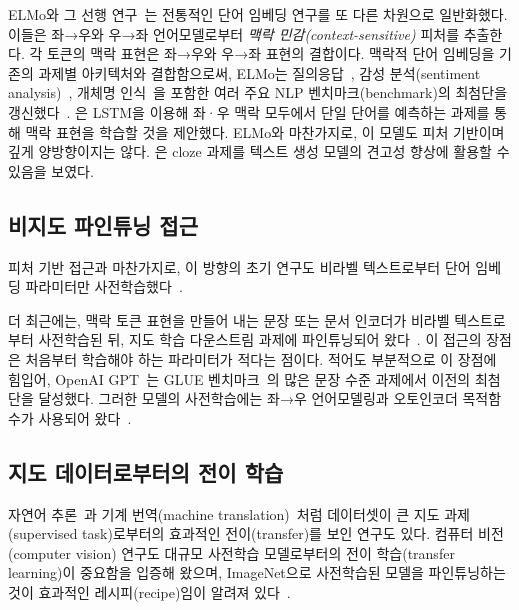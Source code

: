ELMo와 그 선행 연구~\cite{peters-etal:2017:_semi, peters-etal:2018:_deep}는 전통적인 단어 임베딩 연구를 또 다른 차원으로 일반화했다. 이들은 좌→우와 우→좌 언어모델로부터 \emph{맥락 민감(context-sensitive)} 피처를 추출한다. 각 토큰의 맥락 표현은 좌→우와 우→좌 표현의 결합이다. 맥락적 단어 임베딩을 기존의 과제별 아키텍처와 결합함으로써, ELMo는 질의응답~\cite{rajpurkar-etal:2016:_squad}, 감성 분석(sentiment analysis)~\cite{socher-etal:2013:_recur}, 개체명 인식~\cite{tjong-de:2003}을 포함한 여러 주요 NLP 벤치마크(benchmark)의 최첨단을 갱신했다~\cite{peters-etal:2018:_deep}.
\citet{melamud2016context2vec}은 LSTM을 이용해 좌·우 맥락 모두에서 단일 단어를 예측하는 과제를 통해 맥락 표현을 학습할 것을 제안했다. ELMo와 마찬가지로, 이 모델도 피처 기반이며 깊게 양방향이지는 않다.
\citet{fedus2018maskgan}은 cloze 과제를 텍스트 생성 모델의 견고성 향상에 활용할 수 있음을 보였다.




\subsection{비지도 파인튜닝 접근}

피처 기반 접근과 마찬가지로, 이 방향의 초기 연구도 비라벨 텍스트로부터 단어 임베딩 파라미터만 사전학습했다~\cite{collobert-weston:2008}.

더 최근에는, 맥락 토큰 표현을 만들어 내는 문장 또는 문서 인코더가 비라벨 텍스트로부터 사전학습된 뒤, 지도 학습 다운스트림 과제에 파인튜닝되어 왔다~\cite{dai-le:2015:_semi, howard-ruder:2018, radford-etal:2018}. 이 접근의 장점은 처음부터 학습해야 하는 파라미터가 적다는 점이다. 적어도 부분적으로 이 장점에 힘입어, OpenAI GPT~\cite{radford-etal:2018}는 GLUE 벤치마크~\cite{wang-etal:2018:_glue}의 많은 문장 수준 과제에서 이전의 최첨단을 달성했다. 그러한 모델의 사전학습에는 좌→우 언어모델링과 오토인코더 목적함수가 사용되어 왔다~\cite{howard-ruder:2018, radford-etal:2018,dai-le:2015:_semi}.




\subsection{지도 데이터로부터의 전이 학습}

자연어 추론~\cite{conneau-EtAl:2017:EMNLP2017}과 기계 번역(machine translation)~\cite{mccann-etal:2017:_learn_trans}처럼 데이터셋이 큰 지도 과제(supervised task)로부터의 효과적인 전이(transfer)를 보인 연구도 있다.
컴퓨터 비전(computer vision) 연구도 대규모 사전학습 모델로부터의 전이 학습(transfer learning)이 중요함을 입증해 왔으며, ImageNet으로 사전학습된 모델을 파인튜닝하는 것이 효과적인 레시피(recipe)임이 알려져 있다~\cite{imagenet_cvpr09, yosinski2014transferable}.



